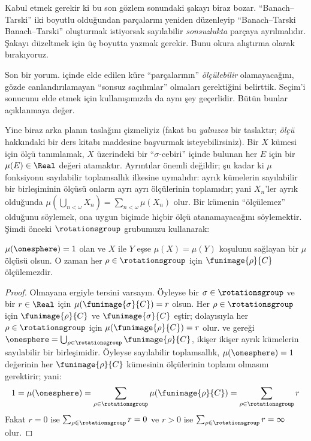 \documentclass[../../../include/open-logic-section]{subfiles}
\begin{document}
Kabul etmek gerekir ki bu son gözlem  sonundaki şakayı
biraz bozar. ``Banach--Tarski'' iki boyutlu olduğundan parçalarını yeniden
düzenleyip ``Banach--Tarski Banach--Tarski'' oluşturmak istiyorsak
sayılabilir \emph{sonsuzlukta} parçaya ayrılmalıdır. Şakayı düzeltmek için
üç boyutta yazmak gerekir. Bunu okura alıştırma olarak bırakıyoruz.

Son bir yorum.  içinde elde edilen küre ``parçalarının''
\emph{ölçülebilir} olamayacağını, gözde canlandırılamayan ``sonsuz
saçılımlar'' olmaları gerektiğini belirttik. Seçim'i
 sonucunu elde etmek için kullanışımızda da aynı
şey geçerlidir. Bütün bunlar açıklanmaya değer.

Yine biraz arka planın taslağını çizmeliyiz (fakat bu \emph{yalnızca} bir
taslaktır; \emph{ölçü} hakkındaki bir ders kitabı maddesine başvurmak
isteyebilirsiniz). Bir $X$ kümesi için ölçü tanımlamak, $X$ üzerindeki bir
``$\sigma$-cebiri'' içinde bulunan her $E$ için bir
$\mu(E)\in\Real$ değeri atamaktır. Ayrıntılar önemli değildir; şu kadar ki
$\mu$ fonksiyonu sayılabilir toplamsallık ilkesine uymalıdır: ayrık
kümelerin sayılabilir bir birleşiminin ölçüsü onların ayrı ayrı ölçülerinin
toplamıdır; yani $X_n$'ler ayrık olduğunda
$\mu(\bigcup_{n < \omega} X_n) = \sum_{n < \omega}\mu(X_n)$ olur. Bir
kümenin ``ölçülemez'' olduğunu söylemek, ona uygun biçimde hiçbir ölçü
atanamayacağını söylemektir. Şimdi önceki $\rotationsgroup$ grubumuzu
kullanarak:

\begin{cor}[Vitali]
$\mu(\onesphere)=1$ olan ve $X$ ile $Y$ eşse
$\mu(X)=\mu(Y)$ koşulunu sağlayan bir $\mu$ ölçüsü olsun. O zaman her
$\rho\in\rotationsgroup$ için $\funimage{\rho}{C}$ ölçülemezdir.
\end{cor}

\begin{proof}
Olmayana ergiyle tersini varsayın. Öyleyse bir
$\sigma\in\rotationsgroup$ ve bir $r\in\Real$ için
$\mu(\funimage{\sigma}{C})=r$ olsun. Her
$\rho\in\rotationsgroup$ için $\funimage{\rho}{C}$ ve
$\funimage{\sigma}{C}$ eştir; dolayısıyla her
$\rho\in\rotationsgroup$ için $\mu(\funimage{\rho}{C})=r$ olur.
 ve  gereği
$\onesphere=\bigcup_{\rho\in\rotationsgroup}\funimage{\rho}{C}$,
ikişer ikişer ayrık kümelerin sayılabilir bir birleşimidir. Öyleyse
sayılabilir toplamsallık, $\mu(\onesphere)=1$ değerinin her
$\funimage{\rho}{C}$ kümesinin ölçülerinin toplamı olmasını gerektirir;
yani:
\[
	1 = \mu(\onesphere) = \sum_{\rho \in \rotationsgroup}\mu(\funimage{\rho}{C}) = \sum_{\rho \in \rotationsgroup}r
\]
Fakat $r=0$ ise $\sum_{\rho\in\rotationsgroup}r=0$ ve $r>0$ ise
$\sum_{\rho\in\rotationsgroup}r=\infty$ olur.
\end{proof}
\end{document}
